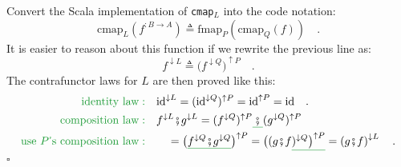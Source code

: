 Convert the Scala implementation of \lstinline!cmap!$_{L}$ into
the code notation:
\[
\text{cmap}_{L}(f^{:B\rightarrow A})\triangleq\text{fmap}_{P}(\text{cmap}_{Q}(f))\quad.
\]
It is easier to reason about this function if we rewrite the previous
line as:
\[
f^{\downarrow L}\triangleq\big(f^{\downarrow Q}\big)^{\uparrow P}\quad.
\]
The contrafunctor laws for $L$ are then proved like this:
\begin{align*}
{\color{greenunder}\text{identity law}:}\quad & \text{id}^{\downarrow L}=(\text{id}^{\downarrow Q})^{\uparrow P}=\text{id}^{\uparrow P}=\text{id}\quad.\\
{\color{greenunder}\text{composition law}:}\quad & f^{\downarrow L}\bef g^{\downarrow L}=(f^{\downarrow Q})^{\uparrow P}\gunderline{\,\bef\,}(g^{\downarrow Q})^{\uparrow P}\\
{\color{greenunder}\text{use }P\text{\textsf{'}s composition law}:}\quad & \quad=\big(\gunderline{f^{\downarrow Q}\bef g^{\downarrow Q}}\big)^{\uparrow P}=\big((g\bef f\gunderline{)^{\downarrow Q}\big)^{\uparrow P}}=\left(g\bef f\right)^{\downarrow L}\quad.
\end{align*}
$\square$

